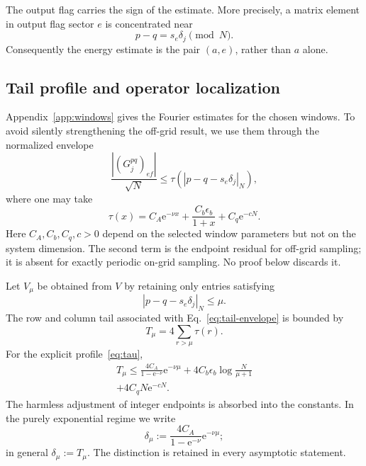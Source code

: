 \documentclass[aps,floatfix,10pt,amssymb,amsmath,superscriptaddress,nofootinbib,longbibliography,nobalancelastpage,twocolumn]{revtex4-2}
\newcommand{\e}{\mathrm{e}}
\begin{document}
The output flag carries the sign of the estimate.  More precisely, a matrix element in output flag sector $e$ is concentrated near
\begin{equation}
 p-q=s_e\delta_j\pmod N.
 \label{eq:signed-peak}
\end{equation}
Consequently the energy estimate is the pair $(a,e)$, rather than $a$ alone.

\subsection{Tail profile and operator localization}

Appendix~\ref{app:windows} gives the Fourier estimates for the chosen windows.  To avoid silently strengthening the off-grid result, we use them through the normalized envelope
\begin{equation}
 \frac{|(G_j^{pq})_{ef}|}{\sqrt N}
 \leq \tau\!\left(|p-q-s_e\delta_j|_N\right),
 \label{eq:tail-envelope}
\end{equation}
where one may take
\begin{equation}
 \tau(x)=C_A\e^{-\nu x}
 +\frac{C_b\epsilon_b}{1+x}+C_q\e^{-cN}.
 \label{eq:tau}
\end{equation}
Here $C_A,C_b,C_q,c>0$ depend on the selected window parameters but not on the system dimension.  The second term is the endpoint residual for off-grid sampling; it is absent for exactly periodic on-grid sampling.  No proof below discards it.

Let $V_\mu$ be obtained from $V$ by retaining only entries satisfying
\begin{equation}
 |p-q-s_e\delta_j|_N\leq\mu.
 \label{eq:band}
\end{equation}
The row and column tail associated with Eq.~\eqref{eq:tail-envelope} is bounded by
\begin{equation}
 T_\mu=4\sum_{r>\mu}\tau(r).
 \label{eq:Tmu-def}
\end{equation}
For the explicit profile~\eqref{eq:tau},
\begin{multline}
T_\mu\leq
\frac{4C_A}{1-\e^{-\nu}}\e^{-\nu\mu}
+4C_b\epsilon_b\log\!\frac{N}{\mu+1}\\
+4C_qN\e^{-cN}.
\label{eq:Tmu}
\end{multline}
The harmless adjustment of integer endpoints is absorbed into the constants.  In the purely exponential regime we write
\begin{equation}
 \delta_\mu:=\frac{4C_A}{1-\e^{-\nu}}\e^{-\nu\mu};
 \label{eq:delta-mu-exp}
\end{equation}
in general $\delta_\mu:=T_\mu$.  The distinction is retained in every asymptotic statement.
\end{document}
